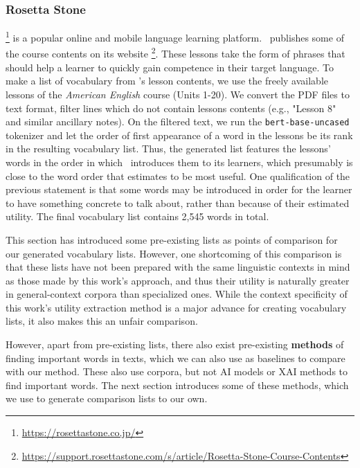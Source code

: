 \subsubsection{Rosetta Stone}
\Rosetta \footnote{\url{https://rosettastone.co.jp/}} is a popular online and mobile language learning platform.
\Rosetta\ publishes some of the course contents on its website \footnote{\url{https://support.rosettastone.com/s/article/Rosetta-Stone-Course-Contents}}.
These lessons take the form of phrases that should help a learner to quickly gain competence in their target language.
To make a list of vocabulary from \Rosetta 's lesson contents, we use the freely available lessons  of the \textit{American English} course (Units 1-20).
We convert the PDF files to text format, filter lines which do not contain lessons contents (e.g., "Lesson 8" and similar ancillary notes).
On the filtered text, we run the \texttt{bert-base-uncased} tokenizer and let the order of first appearance of a word in the lessons be its rank in the resulting vocabulary list.
Thus, the generated list features the lessons' words in the order in which \Rosetta\ introduces them to its learners, which presumably is close to the word order that \Rosetta estimates to be most useful.
One qualification of the previous statement is that some words may be introduced in order for the learner to have something concrete to talk about, rather than because of their estimated utility.
The final vocabulary list contains 2,545 words in total.

This section has introduced some pre-existing lists as points of comparison for our generated vocabulary lists.
However, one shortcoming of this comparison is that these lists have not been prepared with the same linguistic contexts in mind as those made by this work's approach, and thus their utility is naturally greater in general-context corpora than specialized ones.
While the context specificity of this work's utility extraction method is a major advance for creating vocabulary lists, it also makes this an unfair comparison.

However, apart from pre-existing lists, there also exist pre-existing \textbf{methods} of finding important words in texts, which we can also use as baselines to compare with our method.
These also use corpora, but not AI models or XAI methods to find important words.
The next section introduces some of these methods, which we use to generate comparison lists to our own.


